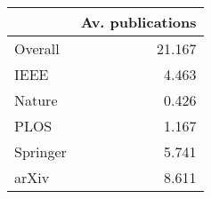 \begin{tabular}{lr}
\toprule
{} &   Av. publications \\
\midrule
Overall  &  21.167 \\
IEEE     &   4.463 \\
Nature   &   0.426 \\
PLOS     &   1.167 \\
Springer &   5.741 \\
arXiv    &   8.611 \\
\bottomrule
\end{tabular}
